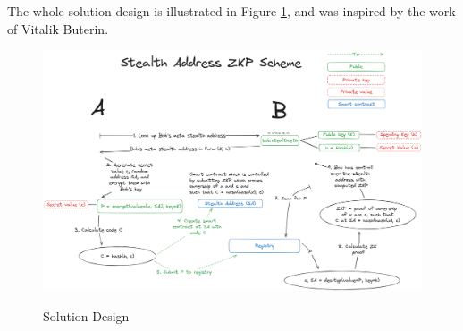 The whole solution design is illustrated in Figure \ref{fig:solution},
and was inspired by the work of Vitalik Buterin\cite{ButerinIncompleteGuide}.

\begin{figure}[h]
    \centering
    \includegraphics[scale=0.15]{assets/images/solution.png}
    \caption{Solution Design}
	\cite{ButerinIncompleteGuide}
    \label{fig:solution}
    \vspace{0.5cm}
\end{figure}

